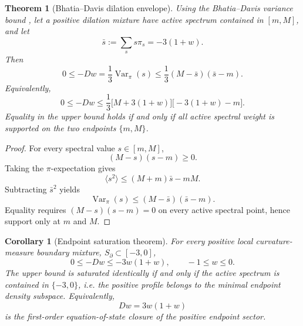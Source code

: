 \documentclass[11pt,a4paper]{article}
\def\Dil{D}%
\numberwithin{equation}{section}
\theoremstyle{definition}
\theoremstyle{plain}
\newtheorem{theorem}[criterion]{Theorem}
\newtheorem{corollary}[criterion]{Corollary}
\theoremstyle{remark}
\newcommand{\Dil}{\mathscr{D}}
\begin{document}
\begin{theorem}[Bhatia--Davis dilation envelope]
Using the Bhatia--Davis variance bound \cite{BhatiaDavis2000}, let a positive dilation mixture have active spectrum contained in \([m,M]\), and let
\begin{equation}
\bar s:=\sum_s s\pi_s=-3(1+w).
\end{equation}
Then
\begin{equation}
\boxed{
0\le-\Dil w
=\frac13\operatorname{Var}_\pi(s)
\le
\frac13(M-\bar s)(\bar s-m).
}
\end{equation}
Equivalently,
\begin{equation}
\boxed{
0\le-\Dil w
\le
\frac13\bigl[M+3(1+w)\bigr]
\bigl[-3(1+w)-m\bigr].
}
\end{equation}
Equality in the upper bound holds if and only if all active spectral weight is supported on the two endpoints \(\{m,M\}\).
\end{theorem}
\begin{proof}
For every spectral value \(s\in[m,M]\),
\begin{equation}
(M-s)(s-m)\ge0.
\end{equation}
Taking the \(\pi\)-expectation gives
\begin{equation}
\langle s^2\rangle\le(M+m)\bar s-mM.
\end{equation}
Subtracting \(\bar s^2\) yields
\begin{equation}
\operatorname{Var}_\pi(s)\le(M-\bar s)(\bar s-m).
\end{equation}
Equality requires \((M-s)(s-m)=0\) on every active spectral point, hence support only at \(m\) and \(M\).
\end{proof}

\begin{corollary}[Endpoint saturation theorem]
For every positive local curvature-measure boundary mixture, \(S_\partial\subset[-3,0]\),
\begin{equation}
\boxed{
0\le-\Dil w\le-3w(1+w),
\qquad -1\le w\le0.
}
\end{equation}
The upper bound is saturated identically if and only if the active spectrum is contained in \(\{-3,0\}\), i.e. the positive profile belongs to the minimal endpoint density subspace. Equivalently,
\begin{equation}
\boxed{
\Dil w=3w(1+w)
}
\end{equation}
is the first-order equation-of-state closure of the positive endpoint sector.
\end{corollary}
\end{document}
